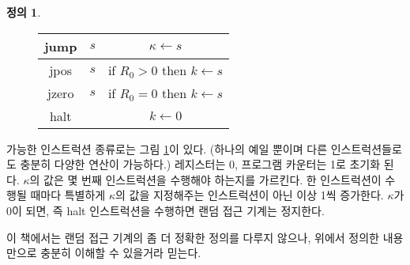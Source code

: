 \documentclass[b5paper]{book}
\theoremstyle{definition}
\newtheorem{defn}{정의}[chapter]
\begin{document}
\begin{defn}
\begin{figure}[!ht]
\begin{tabular}{ ccc }
            jump & $s$ & $\kappa \gets s$ \\ 
            \hline 
            jpos & $s$ & if $R_0 > 0$ then $k \gets s$ \\ 
            \hline 
            jzero & $s$ & if $R_0 = 0$ then $k \gets s$ \\ 
            \hline 
            halt & & $k \gets 0$
        \end{tabular}
        \caption{}
        \label{iiiii}
    \end{figure}
    가능한 인스트럭션 종류로는 그림 \ref{iiiii}이 있다. (하나의 예일 뿐이며 다른 인스트럭션들로도 
    충분히 다양한 연산이 가능하다.)
    레지스터는 0, 프로그램 카운터는 1로 초기화 된다. $\kappa$의 값은 몇 번째 인스트럭션을 수행해야 하는지를 가르킨다.
    한 인스트럭션이 수행될 때마다 특별하게 $\kappa$의 값을 지정해주는 인스트럭션이 아닌 이상 1씩 증가한다.
    $\kappa$가 0이 되면, 즉 halt 인스트럭션을 수행하면 랜덤 접근 기계는 정지한다.
\end{defn}
이 책에서는 랜덤 접근 기계의 좀 더 정확한 정의를 다루지 않으나, 위에서 정의한 내용만으로 
충분히 이해할 수 있을거라 믿는다. 
\end{document}
